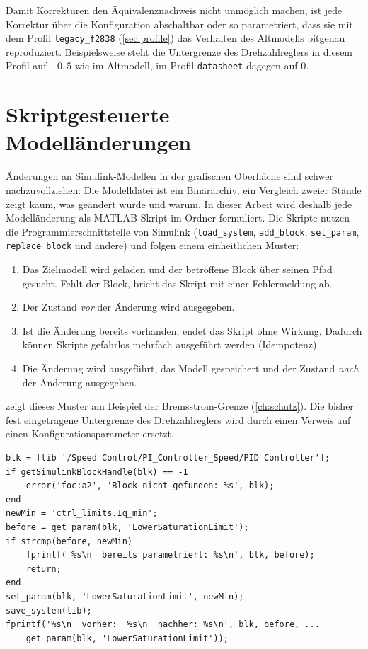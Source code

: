 Damit Korrekturen den Äquivalenznachweis nicht unmöglich machen, ist jede Korrektur über
die Konfiguration abschaltbar oder so parametriert, dass sie mit dem Profil
\texttt{legacy\_f2838} (\cref{sec:profile}) das Verhalten des Altmodells bitgenau
reproduziert. Beispielsweise steht die Untergrenze des Drehzahlreglers in diesem Profil auf
$-0{,}5$ wie im Altmodell, im Profil \texttt{datasheet} dagegen auf $0$.

\section{Skriptgesteuerte Modelländerungen}
\label{sec:skripte}

Änderungen an Simulink-Modellen in der grafischen Oberfläche sind schwer nachzuvollziehen:
Die Modelldatei ist ein Binärarchiv, ein Vergleich zweier Stände zeigt kaum, was geändert
wurde und warum. In dieser Arbeit wird deshalb jede Modelländerung als MATLAB-Skript im
Ordner  formuliert. Die Skripte nutzen die Programmierschnittstelle von
Simulink (\texttt{load\_system}, \texttt{add\_block}, \texttt{set\_param},
\texttt{replace\_block} und andere) und folgen einem einheitlichen Muster:

\begin{enumerate}
  \item Das Zielmodell wird geladen und der betroffene Block über seinen Pfad gesucht.
    Fehlt der Block, bricht das Skript mit einer Fehlermeldung ab.
  \item Der Zustand \emph{vor} der Änderung wird ausgegeben.
  \item Ist die Änderung bereits vorhanden, endet das Skript ohne Wirkung. Dadurch können
    Skripte gefahrlos mehrfach ausgeführt werden (Idempotenz).
  \item Die Änderung wird ausgeführt, das Modell gespeichert und der Zustand \emph{nach}
    der Änderung ausgegeben.
\end{enumerate}

 zeigt dieses Muster am Beispiel der Bremsstrom-Grenze
(\cref{ch:schutz}). Die bisher fest eingetragene Untergrenze des Drehzahlreglers wird durch
einen Verweis auf einen Konfigurationsparameter ersetzt.

\begin{lstlisting}[style=matlab, caption={Auszug aus \skript{foc\_param\_brake\_limit.m}:
    Untergrenze des Drehzahlreglers als Konfigurationsparameter},
    label=lst:brake_limit]
blk = [lib '/Speed Control/PI_Controller_Speed/PID Controller'];
if getSimulinkBlockHandle(blk) == -1
    error('foc:a2', 'Block nicht gefunden: %s', blk);
end
newMin = 'ctrl_limits.Iq_min';
before = get_param(blk, 'LowerSaturationLimit');
if strcmp(before, newMin)
    fprintf('%s\n  bereits parametriert: %s\n', blk, before);
    return;
end
set_param(blk, 'LowerSaturationLimit', newMin);
save_system(lib);
fprintf('%s\n  vorher:  %s\n  nachher: %s\n', blk, before, ...
    get_param(blk, 'LowerSaturationLimit'));
\end{lstlisting}

